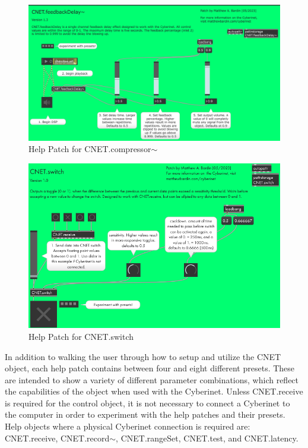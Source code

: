 \begin{figure}
    \centering
    \includegraphics[scale=0.6]{diagrams/maxPatches/compressorHelp.png}
    \caption{Help Patch for CNET.compressor$\sim$}
    \label{fig:compHelp1}
\end{figure}

\begin{figure}
    \centering
    \includegraphics{diagrams/maxPatches/switchHelp.png}
    \caption{Help Patch for CNET.switch}
    \label{fig:switchHelp1}
\end{figure}

In addition to walking the user through how to setup and utilize the CNET object, each help patch contains between four and eight different presets. These are intended to show a variety of different parameter combinations, which reflect the capabilities of the object when used with the Cyberinet. Unless CNET.receive is required for the control object, it is not necessary to connect a Cyberinet to the computer in order to experiment with the help patches and their presets. Help objects where a physical Cyberinet connection is required are: CNET.receive, CNET.record$\sim$, CNET.rangeSet, CNET.test, and CNET.latency.



